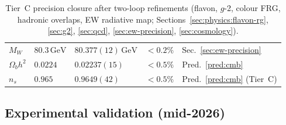 \documentclass[11pt]{article}
\theoremstyle{plain}
\theoremstyle{definition}
\theoremstyle{remark}
\numberwithin{equation}{section}
\begin{document}
\begin{table}[ht]
\begin{tabular}{@{}lllll@{}}
$M_W$ &
  $80.3\,\mathrm{GeV}$ &
  $80.377(12)\,\mathrm{GeV}$ &
  $<0.2\%$ &
  Sec.~\ref{sec:ew-precision} \\
$\Omega_b h^2$ &
  $0.0224$ &
  $0.02237(15)$ &
  $<0.5\%$ &
  Pred.~\ref{pred:cmb} \\
$n_s$ &
  $0.965$ &
  $0.9649(42)$ &
  $<0.5\%$ &
  Pred.~\ref{pred:cmb} (Tier~C) \\
\bottomrule
\end{tabular}
\caption{Tier~C precision closure after two-loop refinements (flavon, $g$-2,
colour FRG, hadronic overlaps, EW radiative map; Sections~\ref{sec:physics:flavon-rg},
\ref{sec:g2}, \ref{sec:qcd}, \ref{sec:ew-precision}, \ref{sec:cosmology}).}
\label{tab:tier-c-precision}
\end{table}

\subsection{Experimental validation (mid-2026)}
\end{document}
